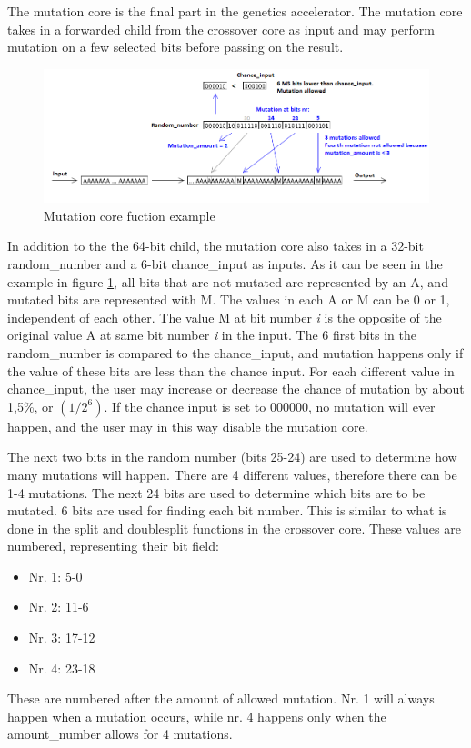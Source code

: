 The mutation core is the final part in the genetics accelerator. The mutation core takes in a forwarded child from the crossover core as input and may perform mutation on a few selected bits before passing on the result. 

\begin{figure}[H]
\includegraphics[width=\textwidth]{fpga/fig/mutation.png}
\caption{Mutation core fuction example}
\label{Fig_Mutation}
\end{figure}

In addition to the the 64-bit child, the mutation core also takes in a 32-bit random\_number and a 6-bit chance\_input as inputs. As it can be seen in the example in figure \ref{Fig_Mutation}, all bits that are not mutated are represented by an A, and mutated bits are represented with M. The values in each A or M can be 0 or 1, independent of each other. The value M at bit number \textit{i} is the opposite of the original value A at same bit number \textit{i} in the input.
The 6 first bits in the random\_number is compared to the chance\_input, and mutation happens only if the value of these bits are less than the chance input. For each different value in chance\_input, the user may increase or decrease the chance of mutation by about 1,5\%, or $(1 / 2^6)$. If the chance input is set to 000000, no mutation will ever happen, and the user may in this way disable the mutation core.

The next two bits in the random number (bits 25-24) are used to determine how many mutations will happen. There are 4 different values, therefore there can be 1-4 mutations.
The next 24 bits are used to determine which bits are to be mutated. 6 bits are used for finding each bit number. This is similar to what is done in the split and doublesplit functions in the crossover core. These values are numbered, representing their bit field:
\begin{itemize}
\item Nr. 1: 5-0
\item Nr. 2: 11-6
\item Nr. 3: 17-12
\item Nr. 4: 23-18
\end{itemize}
These are numbered after the amount of allowed mutation. Nr. 1 will always happen when a mutation occurs, while nr. 4 happens only when the amount\_number allows for 4 mutations.

